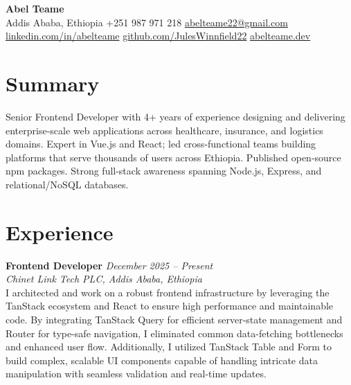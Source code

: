 \documentclass[10pt,a4paper]{article}
\begin{document}
\begin{center}
  {\LARGE\bfseries Abel Teame}\\[5pt]
  Addis Ababa, Ethiopia \quad\textbar\quad
  +251 987 971 218 \quad\textbar\quad
  \href{mailto:abelteame22@gmail.com}{abelteame22@gmail.com}\\[3pt]
  \href{https://linkedin.com/in/abelteame}{linkedin.com/in/abelteame}
  \quad\textbar\quad
  \href{https://github.com/JulesWinnfield22}{github.com/JulesWinnfield22}
  \quad\textbar\quad
  \href{https://abelteame.dev}{abelteame.dev}
\end{center}

\vspace{4pt}

\section{Summary}
Senior Frontend Developer with 4+ years of experience designing and delivering enterprise-scale web
applications across healthcare, insurance, and logistics domains. Expert in Vue.js and React; led
cross-functional teams building platforms that serve thousands of users across Ethiopia. Published
open-source npm packages. Strong full-stack awareness spanning Node.js, Express, and
relational/NoSQL databases.

\section{Experience}

\textbf{Frontend Developer} \hfill \textit{December 2025 -- Present}\\
\textit{Chinet Link Tech PLC, Addis Ababa, Ethiopia}\\[5pt]
I architected and work on a robust frontend infrastructure by leveraging the TanStack ecosystem and
React to ensure high performance and maintainable code. By integrating TanStack Query for efficient
server-state management and Router for type-safe navigation, I eliminated common data-fetching
bottlenecks and enhanced user flow. Additionally, I utilized TanStack Table and Form to build
complex, scalable UI components capable of handling intricate data manipulation with seamless
validation and real-time updates.
\end{document}
